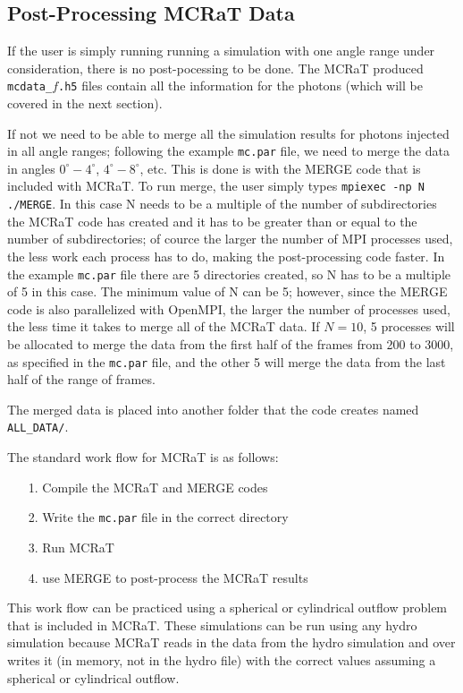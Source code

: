 \documentclass[12pt,a4paper]{article}
\begin{document}
 \subsection{Post-Processing MCRaT Data}
 If the user is simply running running a simulation with one angle range under consideration, there is no post-pocessing to be done. The MCRaT produced \texttt{mcdata\_$f$.h5} files contain all the information for the photons (which will be covered in the next section).
 
 If not we need to be able to merge all the simulation results for photons injected in all angle ranges; following the example \texttt{mc.par} file, we need to merge the data in angles $0^\circ-4^\circ$, $4^\circ-8^\circ$, etc. This is done is with the MERGE code that is included with MCRaT. To run merge, the user simply types \texttt{mpiexec -np N ./MERGE}. In this case N needs to be a multiple of the number of subdirectories the MCRaT code has created and it has to be greater than or equal to the number of subdirectories; of cource the larger the number of MPI processes used, the less work each process has to do, making the post-processing code faster. In the example \texttt{mc.par} file there are 5 directories created, so N has to be a multiple of 5 in this case. The minimum value of N can be 5; however, since the MERGE code is also parallelized with OpenMPI, the larger the number of processes used, the less time it takes to merge all of the MCRaT data.  If $N=10$, 5 processes will be allocated to merge the data from the first half of the frames from 200 to 3000, as specified in the \texttt{mc.par} file, and the other 5 will merge the data from the last half of the range of frames.
 
 The merged data is placed into another folder that the code creates named \texttt{ALL\_DATA/}. \newline
 
 \noindent The standard work flow for MCRaT is as follows:
 \begin{itemize}
 \item[1.] Compile the MCRaT and MERGE codes
 \item[2.] Write the \texttt{mc.par} file in the correct directory
 \item[3.] Run MCRaT
 \item[4.] use MERGE to post-process the MCRaT results
 \end{itemize}
 
 This work flow can be practiced using a spherical or cylindrical outflow problem that is included in MCRaT. These simulations can be run using any hydro simulation because MCRaT reads in the data from the hydro simulation and over writes it (in memory, not in the hydro file) with the correct values assuming a spherical or cylindrical outflow.
 
\end{document}
